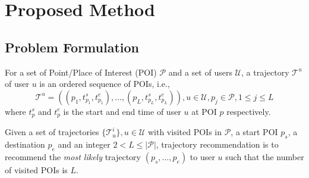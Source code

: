 \section{Proposed Method}
\label{method}


\subsection{Problem Formulation}
\label{method:formulation}
For a set of Point/Place of Interest (POI) $\mathcal{P}$ and a set of users $\mathcal{U}$,
a trajectory $\mathcal{T}^u$ of user $u$ is an ordered sequence of POIs,
i.e.,
\begin{displaymath}
    \mathcal{T}^u = ((p_1, t_{p_1}^s, t_{p_{1}}^e), \dots, (p_L, t_{p_L}^s, t_{p_L}^e)), 
    u \in \mathcal{U}, 
    p_j \in \mathcal{P}, 1 \le j \le L
\end{displaymath}
where $t_p^s$ and $t_p^e$ is the start and end time of user $u$ at POI $p$ respectively.

Given a set of trajectories $\{ \mathcal{T}_u^i \}, u \in \mathcal{U}$ with visited POIs in $\mathcal{P}$, 
a start POI $p_s$, a destination $p_e$ and an integer $2 < L \le |\mathcal{P}|$,
trajectory recommendation is to recommend the \textit{most likely} trajectory $(p_s, \dots, p_e)$ to user $u$ such that
the number of visited POIs is $L$.


